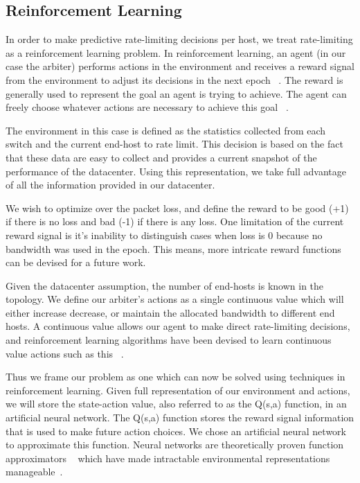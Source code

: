 \subsection{Reinforcement Learning}
In order to make predictive rate-limiting decisions per host, we treat rate-limiting as a reinforcement learning problem. In reinforcement learning, an agent (in our case the arbiter) performs actions 
in the environment and receives a reward signal from the environment to adjust 
its decisions in the next epoch ~\cite{Sutton:1998:IRL:551283}. The reward is 
generally used to represent the goal an agent is trying to achieve. The agent 
can freely choose whatever actions are necessary to achieve this goal 
~\cite{Sutton:1998:IRL:551283}.

The environment in this case is defined as the statistics collected from each 
switch and the current end-host to rate limit. This decision is based on the fact that these data are easy to collect and provides a current snapshot of the performance of the datacenter. Using this representation, we take full advantage of all the information provided in our datacenter.

We wish to optimize over the packet loss, and define the reward to be good (+1) if there is no loss and bad (-1) if there is any loss.  One limitation of the current reward signal is it's inability to distinguish cases when loss is 0 because no bandwidth was used in the epoch. This means, more intricate reward functions can be devised for  a future work.

Given the datacenter assumption, the number of end-hosts is known in the 
topology. We define our arbiter's actions as a single continuous value which will either increase 
decrease, or maintain the allocated bandwidth to different end hosts. A continuous value allows our agent to make direct rate-limiting decisions, and reinforcement learning algorithms have been devised to learn continuous value actions such as this ~\cite{DDPG}. 

Thus we frame our problem as one which can now be solved using techniques in reinforcement learning. Given full representation of our environment and 
actions, we will store the state-action value, also referred to as the Q(s,a) function,  in an artificial neural network. The Q(s,a) function 
stores the reward signal information that is used to make future action choices. We chose an artificial neural network to approximate this function. Neural networks are theoretically proven function
approximators ~\cite{Cybenko1989} which have made intractable environmental representations manageable~\cite{Sutton:1998:IRL:551283}.



